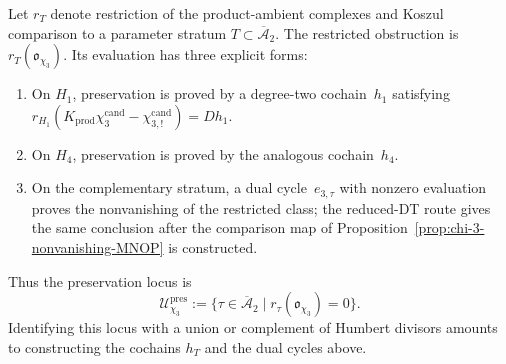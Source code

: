 \begin{remark}%
\label{rem:chi-3-Koszul-locus-scope}%
Let $r_T$ denote restriction of the product-ambient complexes and
Koszul comparison to a parameter stratum
$T\subset\overline{\mathcal A}_2$.  The restricted obstruction is
$r_T(\mathfrak o_{\chi_3})$.  Its evaluation has three explicit
forms:
\begin{enumerate}[label=\textup{(\alph*)}]
\item On $H_1$, preservation is proved by a degree-two cochain~$h_1$
satisfying
$r_{H_1}(K_{\mathrm{prod}}\chi_3^{\mathrm{cand}}
-\chi_{3,!}^{\mathrm{cand}})=D h_1$.
\item On $H_4$, preservation is proved by the analogous cochain~$h_4$.
\item On the complementary stratum, a dual cycle~$e_{3,\tau}$ with
nonzero evaluation proves the nonvanishing of the restricted class;
the reduced-DT route gives the same conclusion after the comparison
map of Proposition~\ref{prop:chi-3-nonvanishing-MNOP} is constructed.
\end{enumerate}
Thus the preservation locus is
\begin{equation}
\label{eq:chi-3-Koszul-scope}
 \mathcal U_{\chi_3}^{\mathrm{pres}}
 :=\{\tau\in\overline{\mathcal A}_2
 \mid r_\tau(\mathfrak o_{\chi_3})=0\}.
\end{equation}
Identifying this locus with a union or complement of Humbert divisors
amounts to constructing the cochains $h_T$ and the dual cycles above.
\end{remark}

